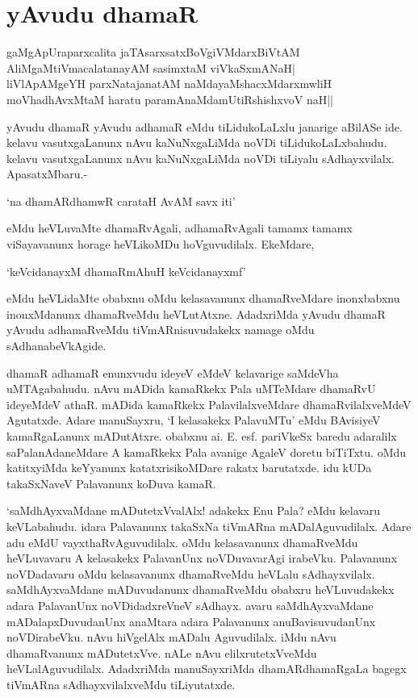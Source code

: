 \chapter{yAvudu dhamaR}

\begin{shloka}
gaMgApUraparxcalita jaTAsarxsatxBoVgiVMdarxBiVtAM\\
AliMgaMtiVmacalatanayAM sasimxtaM viVkaSxmANaH|\\
liVlApAMgeYH parxNatajanatAM naMdayaMshacxMdarxmwliH\\
moVhadhAvxMtaM haratu paramAnaMdamUtiRshishxvoV naH||
\end{shloka}

yAvudu dhamaR yAvudu adhamaR eMdu tiLidukoLaLxlu janarige aBilASe ide. kelavu vasutxgaLanunx nAvu kaNuNxgaLiMda noVDi tiLidukoLaLxbahudu. kelavu vasutxgaLanunx nAvu kaNuNxgaLiMda noVDi tiLiyalu sAdhayxvilalx. ApasatxMbaru.-

\begin{shloka}
`na dhamARdhamwR carataH AvAM savx iti'
\end{shloka}

\noindent eMdu heVLuvaMte dhamaRvAgali, adhamaRvAgali tamamx tamamx viSayavanunx horage heVLikoMDu hoVguvudilalx. EkeMdare,

\begin{shloka}
`keVcidanayxM dhamaRmAhuH keVcidanayxmf'
\end{shloka}

\noindent eMdu heVLidaMte obabxnu oMdu kelasavanunx dhamaRveMdare inonxbabxnu inonxMdanunx dhamaRveMdu heVLutAtxne. AdadxriMda yAvudu dhamaR yAvudu adhamaRveMdu tiVmARnisuvudakekx namage oMdu sAdhanabeVkAgide.

dhamaR adhamaR enunxvudu ideyeV eMdeV kelavarige saMdeVha uMTAgabahudu. nAvu mADida kamaRkekx Pala uMTeMdare dhamaRvU ideyeMdeV athaR. mADida kamaRkekx PalavilalxveMdare dhamaRvilalxveMdeV Agutatxde. Adare manuSayxru, `I kelasakekx PalavuMTu' eMdu BAvisiyeV kamaRgaLanunx mADutAtxre. obabxnu ai. E. esf. pariVkeSx baredu adaralilx saPalanAdaneMdare A kamaRkekx Pala avanige AgaleV doretu biTiTxtu. oMdu katitxyiMda keYyanunx katatxrisikoMDare rakatx barutatxde. idu kUDa takaSxNaveV Palavanunx koDuva kamaR. 

`saMdhAyxvaMdane mADutetxVvalAlx! adakekx Enu Pala? eMdu kelavaru keVLabahudu. idara Palavanunx takaSxNa tiVmARna mADalAguvudilalx. Adare adu eMdU vayxthaRvAguvudilalx. oMdu kelasavanunx dhamaRveMdu heVLuvavaru A kelasakekx PalavanUnx noVDuvavarAgi irabeVku. Palavanunx noVDadavaru oMdu kelasavanunx dhamaRveMdu heVLalu sAdhayxvilalx. saMdhAyxvaMdane mADuvudanunx dhamaRveMdu obabxru heVLuvudakekx adara PalavanUnx noVDidadxreVneV sAdhayx. avaru saMdhAyxvaMdane mADalapxDuvudanUnx anaMtara adara Palavanunx anuBavisuvudanUnx noVDirabeVku. nAvu hiVgelAlx mADalu Aguvudilalx. iMdu nAvu dhamaRvanunx mADutetxVve. nALe nAvu elilxrutetxVveMdu heVLalAguvudilalx. AdadxriMda manuSayxriMda dhamARdhamaRgaLa bagegx tiVmARna sAdhayxvilalxveMdu tiLiyutatxde.

